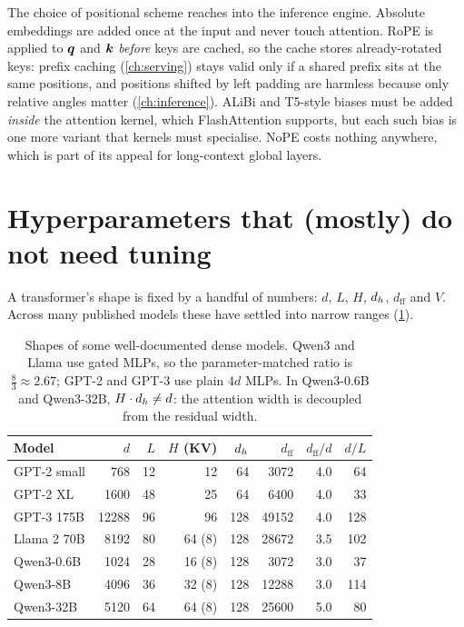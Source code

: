 \begin{systemslens}
The choice of positional scheme reaches into the inference engine. Absolute embeddings are added once at the
input and never touch attention. RoPE is applied to $\bm{q}$ and $\bm{k}$ \emph{before} keys are
cached, so the cache stores already-rotated keys: prefix caching (\cref{ch:serving}) stays valid only if a
shared prefix sits at the same positions, and positions shifted by left padding are harmless because only
relative angles matter (\cref{ch:inference}). ALiBi and T5-style biases must be added \emph{inside} the
attention kernel, which FlashAttention supports, but each such bias is one more variant that kernels must
specialise. NoPE costs nothing anywhere, which is part of its appeal for long-context global layers.
\end{systemslens}

\section{Hyperparameters that (mostly) do not need tuning}\label{sec:archdesign:hparams}

A transformer's shape is fixed by a handful of numbers: $d$, $L$, $H$, $d_{h}$, $d_\text{ff}$ and $V$.
Across many published models these have settled into narrow ranges (\cref{tab:archdesign:shapes}).

\begin{table}[t]
\centering\small
\begin{tabular}{@{}lrrrrrrr@{}}
\toprule
Model & $d$ & $L$ & $H$ (KV) & $d_{h}$ & $d_\text{ff}$ & $d_\text{ff}/d$ & $d/L$\\
\midrule
GPT-2 small & 768 & 12 & 12 & 64 & 3072 & 4.0 & 64\\
GPT-2 XL & 1600 & 48 & 25 & 64 & 6400 & 4.0 & 33\\
GPT-3 175B & 12288 & 96 & 96 & 128 & 49152 & 4.0 & 128\\
Llama 2 70B & 8192 & 80 & 64 (8) & 128 & 28672 & 3.5 & 102\\
Qwen3-0.6B & 1024 & 28 & 16 (8) & 128 & 3072 & 3.0 & 37\\
Qwen3-8B & 4096 & 36 & 32 (8) & 128 & 12288 & 3.0 & 114\\
Qwen3-32B & 5120 & 64 & 64 (8) & 128 & 25600 & 5.0 & 80\\
\bottomrule
\end{tabular}
\caption{Shapes of some well-documented dense models. Qwen3 and Llama use gated MLPs, so the
parameter-matched ratio is $\frac83\approx2.67$; GPT-2 and GPT-3 use plain 4$d$ MLPs. In Qwen3-0.6B and
Qwen3-32B, $H\cdot d_{h}\neq d$: the attention width is decoupled from the residual width.}
\label{tab:archdesign:shapes}
\end{table}

